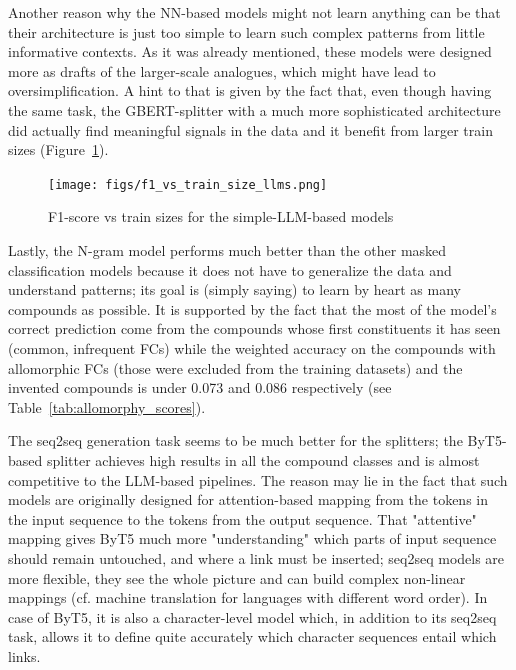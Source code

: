 \documentclass[11pt]{article}
\begin{document}
Another reason why the NN-based models might not learn anything can be that their architecture is just too simple to learn such complex patterns from little informative contexts. As it was already mentioned, these models were designed more as drafts of the larger-scale analogues, which might have lead to oversimplification. A hint to that is given by the fact that, even though having the same task, the GBERT-splitter with a much more sophisticated architecture did actually find meaningful signals in the data and it benefit from larger train sizes (Figure~\ref{fig:train_sizes_llms}).

\begin{figure}[hbt!]
    \centering
    \texttt{[image: figs/f1\_vs\_train\_size\_llms.png]}
    \caption{F1-score vs train sizes for the simple-LLM-based models}
    \label{fig:train_sizes_llms}
\end{figure}


Lastly, the N-gram model performs much better than the other masked classification models because it does not have to generalize the data and understand patterns; its goal is (simply saying) to learn by heart as many compounds as possible. It is supported by the fact that the most of the model's correct prediction come from the compounds whose first constituents it has seen (common, infrequent FCs) while the weighted accuracy on the compounds with allomorphic FCs (those were excluded from the training datasets) and the invented compounds is under 0.073 and 0.086 respectively (see Table~\ref{tab:allomorphy_scores}).


The seq2seq generation task seems to be much better for the splitters; the ByT5-based splitter achieves high results in all the compound classes and is almost competitive to the LLM-based pipelines. The reason may lie in the fact that such models are originally designed for attention-based mapping from the tokens in the input sequence to the tokens from the output sequence. That "attentive" mapping gives ByT5 much more "understanding" which parts of input sequence should remain untouched, and where a link must be inserted; seq2seq models are more flexible, they see the whole picture and can build complex non-linear mappings (cf. machine translation for languages with different word order). In case of ByT5, it is also a character-level model which, in addition to its seq2seq task, allows it to define quite accurately which character sequences entail which links.
\end{document}

